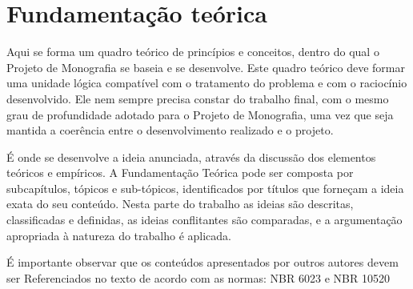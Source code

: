 \chapter{Fundamentação teórica}

Aqui se forma um quadro teórico de princípios e conceitos, dentro do qual o
Projeto de Monografia se baseia e se desenvolve. Este quadro teórico deve formar
uma unidade lógica compatível com o tratamento do problema e com o raciocínio
desenvolvido. Ele nem sempre precisa constar do trabalho final, com o mesmo grau
de profundidade adotado para o Projeto de Monografia, uma vez que seja mantida a
coerência entre o desenvolvimento realizado e o projeto.

É onde se desenvolve a ideia anunciada, através da discussão dos elementos
teóricos e empíricos. A Fundamentação Teórica pode ser composta por
subcapítulos, tópicos e sub-tópicos, identificados por títulos que forneçam a
ideia exata do seu conteúdo. Nesta parte do trabalho as ideias são descritas,
classificadas e definidas, as ideias conflitantes são comparadas, e a
argumentação apropriada à natureza do trabalho é aplicada.

É importante observar que os conteúdos apresentados por outros autores devem ser
Referenciados no texto de acordo com as normas: NBR 6023 e NBR 10520
